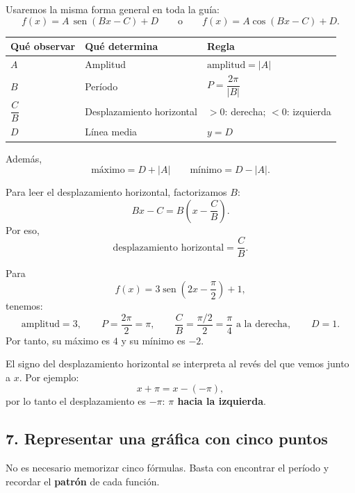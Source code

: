 \documentclass[12pt,letterpaper]{article}
\providecommand{\sen}{\operatorname{sen}}
\begin{document}
Usaremos la misma forma general en toda la guía:
\[
\boxed{f(x)=A\,\sen(Bx-C)+D}
\qquad\text{o}\qquad
\boxed{f(x)=A\cos(Bx-C)+D}.
\]

\begin{center}
\renewcommand{\arraystretch}{1.55}
\begin{tabular}{p{}p{}p{}}
\toprule
Qué observar & Qué determina & Regla \\
\midrule
$A$ & Amplitud & $\text{amplitud}=|A|$ \\
$B$ & Período & $P=\dfrac{2\pi}{|B|}$ \\
$\dfrac{C}{B}$ & Desplazamiento horizontal & $>0$: derecha; $<0$: izquierda \\
$D$ & Línea media & $y=D$ \\
\bottomrule
\end{tabular}
\end{center}

Además,
\[
\boxed{\text{máximo}=D+|A|}
\qquad
\boxed{\text{mínimo}=D-|A|}.
\]

Para leer el desplazamiento horizontal, factorizamos $B$:
\[
Bx-C=B\left(x-\frac{C}{B}\right).
\]
Por eso,
\[
\boxed{\text{desplazamiento horizontal}=\frac{C}{B}}.
\]

\begin{ejemplobox}
Para
\[
f(x)=3\sen\left(2x-\frac{\pi}{2}\right)+1,
\]
tenemos:
\[
\text{amplitud}=3,
\qquad
P=\frac{2\pi}{2}=\pi,
\qquad
\frac{C}{B}=\frac{\pi/2}{2}=\frac{\pi}{4}\text{ a la derecha},
\qquad
D=1.
\]
Por tanto, su máximo es $4$ y su mínimo es $-2$.
\end{ejemplobox}

\begin{alertabox}
El signo del desplazamiento horizontal se interpreta al revés del que vemos junto a $x$. Por ejemplo:
\[
x+\pi=x-(-\pi),
\]
por lo tanto el desplazamiento es $-\pi$: \textbf{$\pi$ hacia la izquierda}.
\end{alertabox}

\newpage
\subsection{7. Representar una gráfica con cinco puntos}

No es necesario memorizar cinco fórmulas. Basta con encontrar el período y recordar el \textbf{patrón} de cada función.
\end{document}
